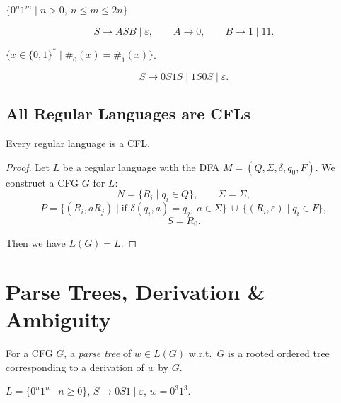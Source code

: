 \begin{example}
$\{0^n 1^m \mid n > 0,\ n \leq m \leq 2n\}$.

\[
S \to ASB \mid \varepsilon, \qquad A \to 0, \qquad B \to 1 \mid 11.
\]
\end{example}

\begin{example}
$\{ x \in \{0,1\}^* \mid \#_0(x) = \#_1(x) \}$.

\[
S \to 0S1S \mid 1S0S \mid \varepsilon.
\]
\end{example}

\subsection*{All Regular Languages are CFLs}

\begin{blackbox}
\begin{proposition}
Every regular language is a CFL.
\end{proposition}
\end{blackbox}

\begin{proof}
Let $L$ be a regular language with the DFA $M = (Q, \Sigma, \delta, q_0, F)$. We construct a CFG $G$ for $L$:
\[
N = \{ R_i \mid q_i \in Q \}, \qquad \Sigma = \Sigma,
\]
\[
P = \{ (R_i, aR_j) \mid \text{if } \delta(q_i, a) = q_j,\ a \in \Sigma \} \ \cup\ \{ (R_i, \varepsilon) \mid q_i \in F \},
\]
\[
S = R_0.
\]

Then we have $L(G) = L$.
\end{proof}

\section{Parse Trees, Derivation \& Ambiguity}

\begin{greybox}
\begin{definition}
For a CFG $G$, a \emph{parse tree} of $w \in L(G)$ w.r.t.\ $G$ is a rooted ordered tree corresponding to a derivation of $w$ by $G$.
\end{definition}
\end{greybox}

\begin{example}
$L = \{0^n1^n \mid n \geq 0\}$, $S \to 0S1 \mid \varepsilon$, $w = 0^3 1^3$.

\begin{center}
\end{center}
\end{example}

